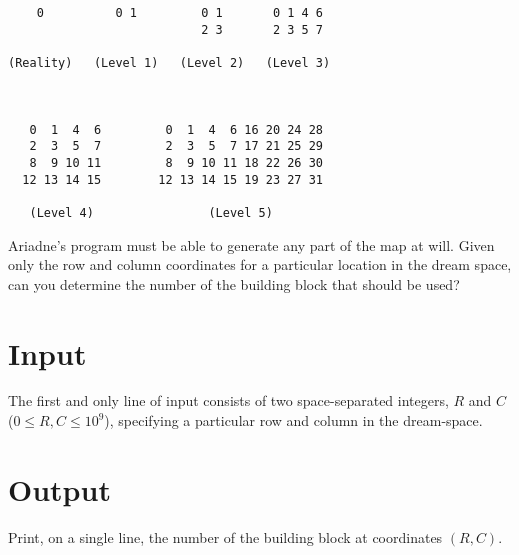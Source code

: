 \begin{center}\ttfamily{}
\begin{minipage}{45\wd0}
\begin{verbatim}
    0          0 1         0 1       0 1 4 6
                           2 3       2 3 5 7

(Reality)   (Level 1)   (Level 2)   (Level 3)



   0  1  4  6         0  1  4  6 16 20 24 28
   2  3  5  7         2  3  5  7 17 21 25 29
   8  9 10 11         8  9 10 11 18 22 26 30
  12 13 14 15        12 13 14 15 19 23 27 31

   (Level 4)                (Level 5)

\end{verbatim}
\end{minipage}
\end{center}

Ariadne's program must be able to generate any part of the map at will. Given only the row and column coordinates for a particular location in the dream space, can you determine the number of the building block that should be used?

\section*{Input}
The first and only line of input consists of two space-separated integers, $R$ and $C$ ($0 \leq R, C \leq 10^{9}$), specifying a particular row and column in the dream-space.

\section*{Output}
Print, on a single line, the number of the building block at coordinates $(R, C)$.